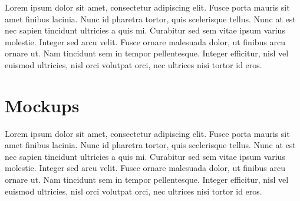 \documentclass{article}
\begin{document}
Lorem ipsum dolor sit amet, consectetur adipiscing elit. Fusce porta
mauris sit amet finibus lacinia. Nunc id pharetra tortor, quis
scelerisque tellus. Nunc at est nec sapien tincidunt ultricies a quis
mi. Curabitur sed sem vitae ipsum varius molestie. Integer sed arcu
velit. Fusce ornare malesuada dolor, ut finibus arcu ornare ut. Nam
tincidunt sem in tempor pellentesque. Integer efficitur, nisl vel
euismod ultricies, nisl orci volutpat orci, nec ultrices nisi tortor id
eros.

\section{Mockups}\label{mockups}

Lorem ipsum dolor sit amet, consectetur adipiscing elit. Fusce porta
mauris sit amet finibus lacinia. Nunc id pharetra tortor, quis
scelerisque tellus. Nunc at est nec sapien tincidunt ultricies a quis
mi. Curabitur sed sem vitae ipsum varius molestie. Integer sed arcu
velit. Fusce ornare malesuada dolor, ut finibus arcu ornare ut. Nam
tincidunt sem in tempor pellentesque. Integer efficitur, nisl vel
euismod ultricies, nisl orci volutpat orci, nec ultrices nisi tortor id
eros.



\end{document}
